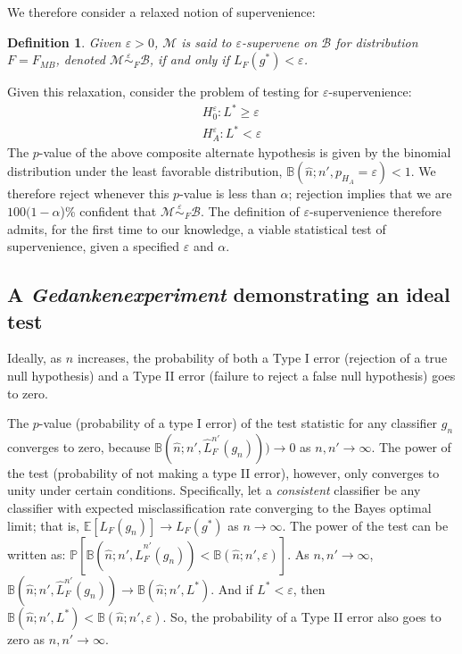 \documentclass{article}
\newcommand{\conv}{\rightarrow}
\newcommand{\mB}{\mathcal{B}}
\newcommand{\mM}{\mathcal{M}}
\newcommand{\PP}{\mathbb{P}}           %
\newcommand{\EE}{\mathbb{E}}           %
\newcommand{\eps}{\varepsilon}
\providecommand{\mh}[1]{\widehat{#1}}
\newcommand{\hL}{\widehat{L}}
\newcommand{\MeB}{\mM \overset{\varepsilon}{{\sim}}_{F} \mB}
\newtheorem{defi}{Definition}
\begin{document}
We therefore consider a relaxed notion of supervenience:
\begin{defi}
\label{def2}
Given $\varepsilon > 0$, $\mM$ is said to $\varepsilon$-\textit{supervene} on $\mB$ for distribution $F=F_{MB}$, denoted $\MeB$, if and only if $L_{F}(g^*) < \varepsilon$.
\end{defi}
\noindent Given this relaxation, consider the problem of testing for $\eps$-supervenience:
\begin{align*}
	H_0^{\eps}: L^* \geq \eps \\
	H_A^{\eps}: L^* < \eps
\end{align*}
The $p$-value of the above composite alternate hypothesis is given by the binomial distribution under the least favorable distribution, $\mathbb{B}(\mh{n}; n', p_{H_A}=\eps)<1$.  We therefore reject whenever this $p$-value is less than $\alpha$; rejection implies that we are $100(1-\alpha$)\% confident that $\MeB$.   The definition of $\eps$-supervenience therefore admits, for the first time to our knowledge, a viable statistical test of supervenience, given a specified $\eps$ and $\alpha$. 

\subsection*{A \emph{Gedankenexperiment} demonstrating an ideal test} %
\label{sub:uc}

Ideally, as $n$ increases, the probability of both a Type I error (rejection of a true null hypothesis) and a Type II error (failure to reject a false null hypothesis) goes to zero.  


The $p$-value 
(probability of a type I error)
of the test statistic for any classifier $g_n$ converges to zero, because $\mathbb{B}(\mh{n}; n', \hL^{n'}_F(g_n))) \conv 0$ as $n,n' \conv \infty$. The power of the test (probability of not making a type II error), however, only converges to unity under certain conditions.  Specifically, let a  \emph{consistent} classifier be any classifier with expected misclassification rate converging to the Bayes optimal limit; that is, $\EE[L_{F}(g_n)] \conv L_{F}(g^*)$ as $n\conv \infty$. The power of the test can be written as: $\PP[\mathbb{B}(\mh{n}; n', \hL^{n'}_F(g_n)) < \mathbb{B}(\mh{n}; n', \eps)]$.  As $n,n' \conv \infty$, $\mathbb{B}(\mh{n}; n', \hL^{n'}_F(g_n)) \conv \mathbb{B}(\mh{n}; n', L^*)$.  And if $L^* < \eps$, then $\mathbb{B}(\mh{n}; n', L^*) < \mathbb{B}(\mh{n}; n', \eps)$.  So, the probability of a Type II error also goes to zero as $n,n' \conv \infty$.
\end{document}
